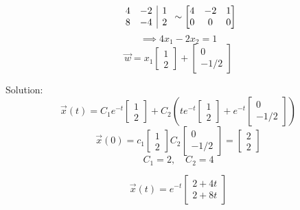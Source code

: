\documentclass[12pt]{article}
\begin{document}
\begin{enumerate}
    \[\begin{array}{c c | c}
        4 & -2 & 1\\
        8 & -4 & 2
    \end{array} \sim \begin{bmatrix}
        4 & -2 & 1\\
        0 & 0 & 0
    \end{bmatrix}\]
    \[\implies 4x_1 - 2x_2 = 1\]
    \[\vec{w} = x_1 \begin{bmatrix}
        1\\2
    \end{bmatrix} + \begin{bmatrix}
        0\\ -1/2
    \end{bmatrix}\]

    Solution:
    \[\vec{x}(t) = C_1 e^{-t} \begin{bmatrix}
        1\\2
    \end{bmatrix} + C_2 \left(te^{-t} \begin{bmatrix}
        1\\2
    \end{bmatrix} + e^{-t} \begin{bmatrix}
        0\\ -1/2
    \end{bmatrix}\right)\]
    \[\vec{x}(0) = c_1 \begin{bmatrix}
        1\\2
    \end{bmatrix} C_2 \begin{bmatrix}
        0 \\ -1/2
    \end{bmatrix} = \begin{bmatrix}
        2\\2
    \end{bmatrix}\]
    \[C_1 = 2, \quad C_2 = 4\]

    \[\boxed{\vec{x}(t) = e^{-t} \begin{bmatrix}
        2 + 4t\\
        2 + 8t
    \end{bmatrix}}\]
\end{enumerate}
\end{document}
